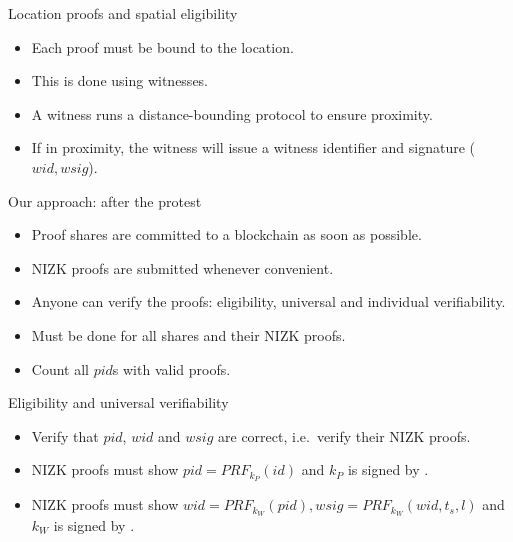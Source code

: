 \begin{columns}[t]
\begin{column}{0.32\linewidth}
    \begin{whiteblock}{Location proofs and spatial eligibility}
      \begin{itemize}
        \item Each proof must be bound to the location.
        \item This is done using witnesses.
        \item A witness runs a distance-bounding protocol to ensure proximity.
        \item If in proximity, the witness will issue a witness identifier and 
          signature (\(wid, wsig\)).
      \end{itemize}
    \end{whiteblock}

    \begin{greenblock}{Our approach: after the protest}
      \begin{itemize}
        \item Proof shares are committed to a blockchain as soon as possible.
        \item \ac{NIZK} proofs are submitted whenever convenient.
        \item Anyone can verify the proofs: eligibility, universal and 
          individual verifiability.
        \item Must be done for all shares and their \ac{NIZK} proofs.
        \item Count all \(pid\)s with valid proofs.
      \end{itemize}
    \end{greenblock}

    \begin{whiteblock}{Eligibility and universal verifiability}
      \begin{itemize}
        \item Verify that \(pid\), \(wid\) and \(wsig\) are correct, i.e.\ verify 
          their \ac{NIZK} proofs.
        \item \ac{NIZK} proofs must show \(pid = PRF_{k_P}(id)\) and \(k_P\) is 
          signed by .
        \item \ac{NIZK} proofs must show \(wid = PRF_{k_W}(pid), wsig = 
            PRF_{k_W}(wid, t_s, l)\) and \(k_W\) is signed by .
      \end{itemize}
    \end{whiteblock}


\end{column}
\end{columns}
